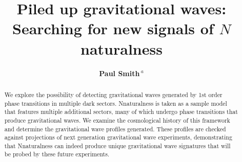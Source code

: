 \documentclass[nofootinbib,twocolumn,preprintnumbers]{revtex4-2}
\begin{document}
\def\lsim{\mathrel{\rlap{\lower4pt\hbox{\hskip1pt$\sim$}}
  \raise1pt\hbox{$<$}}}
\def\gsim{\mathrel{\rlap{\lower4pt\hbox{\hskip1pt$\sim$}}
  \raise1pt\hbox{$>$}}}
\newcommand{\vev}[1]{ \left\langle {#1} \right\rangle }
\newcommand{\bra}[1]{ \langle {#1} | }
\newcommand{\ket}[1]{ | {#1} \rangle }
\newcommand{\ev}{ {\rm eV} }
\newcommand{\kev}{{\rm keV}}
\newcommand{\mev}{{\rm MeV}}
\newcommand{\gev}{{\mathrm GeV}}
\newcommand{\tev}{{\rm TeV}}
\newcommand{\mpl}{$M_{Pl}$}
\newcommand{\mw}{$M_{W}$}
\newcommand{\Ft}{F_{T}}
\newcommand{\Zparity}{\mathbb{Z}_2}
\newcommand{\BLambda}{\boldsymbol{\lambda}}
\newcommand{\met}{\;\not\!\!\!{E}_T}
\newcommand{\beq}{\begin{equation}}
\newcommand{\eeq}{\end{equation}}
\newcommand{\bea}{\begin{eqnarray}}
\newcommand{\eea}{\end{eqnarray}}
\newcommand{\nn}{\nonumber}
\newcommand{\hc}{\mathrm{h.c.}}
\newcommand{\eps}{\epsilon}
\newcommand{\bwt}{\begin{widetext}}
\newcommand{\ewt}{\end{widetext}}
\newcommand{\draftnote}[1]{{\bf\color{blue} #1}}

\newcommand{\cO}{{\cal O}}
\newcommand{\cL}{{\cal L}}
\newcommand{\cM}{{\cal M}}

\newcommand{\fref}[1]{Fig.~\ref{fig:#1}} 
\newcommand{\eref}[1]{Eq.~\eqref{eq:#1}} 
\newcommand{\aref}[1]{Appendix~\ref{app:#1}}
\newcommand{\sref}[1]{Section~\ref{sec:#1}}
\newcommand{\tref}[1]{Table~\ref{tab:#1}}

\title{\LARGE{{\bf{Piled up gravitational waves:} \\
\bf{Searching for new signals of $N$naturalness} }}}
\author{{\bf {Paul Smith$\,^{a}$}}}



\begin{abstract}
We explore the possibility of detecting gravitational waves generated by 1st order phase transitions in multiple dark sectors. Nnaturalness is taken as a sample model that features multiple additional sectors, many of which undergo phase transitions that produce gravitational waves. We examine the cosmological history of this framework and determine the gravitational wave profiles generated. These profiles are checked against projections of next generation gravitational wave experiments, demonstrating that Nnaturalness can indeed produce unique gravitational wave signatures that will be probed by these future experiments. 
\end{abstract}
\end{document}
